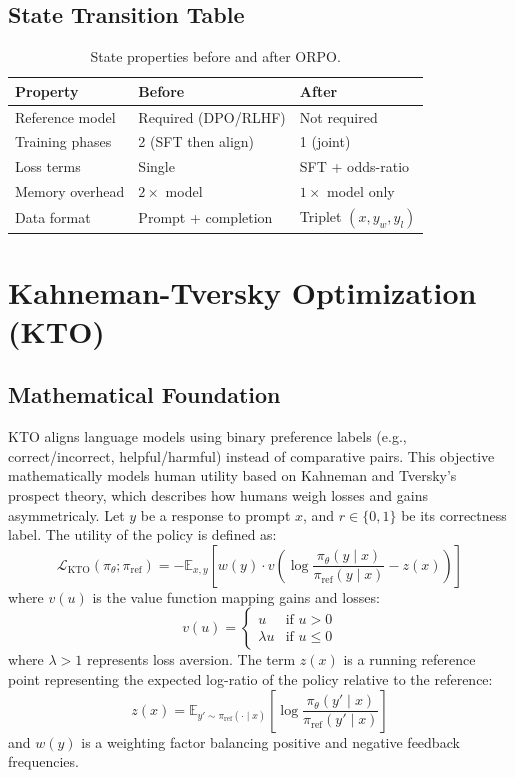 \subsection{State Transition Table}
\begin{table}[h]\centering
\begin{tabular}{lll}\toprule
\textbf{Property} & \textbf{Before} & \textbf{After}\\\midrule
Reference model & Required (DPO/RLHF) & Not required\\
Training phases & 2 (SFT then align) & 1 (joint)\\
Loss terms & Single & SFT + odds-ratio\\
Memory overhead & $2\times$ model & $1\times$ model only\\
Data format & Prompt + completion & Triplet $(x, y_w, y_l)$\\\bottomrule
\end{tabular}
\caption{State properties before and after ORPO.}
\end{table}

\newpage
\section{Kahneman-Tversky Optimization (KTO)}

\subsection{Mathematical Foundation}
KTO aligns language models using binary preference labels (e.g., correct/incorrect, helpful/harmful) instead of comparative pairs. This objective mathematically models human utility based on Kahneman and Tversky's prospect theory, which describes how humans weigh losses and gains asymmetricaly.
Let $y$ be a response to prompt $x$, and $r \in \{0, 1\}$ be its correctness label. The utility of the policy is defined as:
\begin{equation}
  \mathcal{L}_{\text{KTO}}(\pi_\theta; \pi_{\text{ref}}) = -\mathbb{E}_{x, y} \left[ w(y) \cdot v\left( \log \frac{\pi_\theta(y \mid x)}{\pi_{\text{ref}}(y \mid x)} - z(x) \right) \right]
\end{equation}
where $v(u)$ is the value function mapping gains and losses:
\begin{equation}
  v(u) = \begin{cases} u & \text{if } u > 0 \\ \lambda u & \text{if } u \le 0 \end{cases}
\end{equation}
where $\lambda > 1$ represents loss aversion. The term $z(x)$ is a running reference point representing the expected log-ratio of the policy relative to the reference:
\begin{equation}
  z(x) = \mathbb{E}_{y' \sim \pi_{\text{ref}}(\cdot \mid x)} \left[ \log \frac{\pi_\theta(y' \mid x)}{\pi_{\text{ref}}(y' \mid x)} \right]
\end{equation}
and $w(y)$ is a weighting factor balancing positive and negative feedback frequencies.

